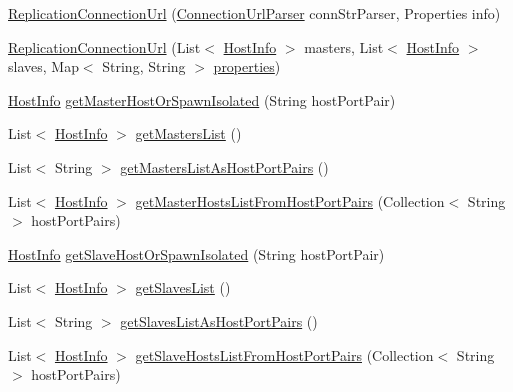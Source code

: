 \begin{DoxyCompactItemize}
\item 
\mbox{\hyperlink{classcom_1_1mysql_1_1cj_1_1conf_1_1url_1_1_replication_connection_url_a47f9dd61da2b65fffb464040033f39d1}{Replication\+Connection\+Url}} (\mbox{\hyperlink{classcom_1_1mysql_1_1cj_1_1conf_1_1_connection_url_parser}{Connection\+Url\+Parser}} conn\+Str\+Parser, Properties info)
\item 
\mbox{\hyperlink{classcom_1_1mysql_1_1cj_1_1conf_1_1url_1_1_replication_connection_url_a5f5fa218d72c2bdba66c694143ad568d}{Replication\+Connection\+Url}} (List$<$ \mbox{\hyperlink{classcom_1_1mysql_1_1cj_1_1conf_1_1_host_info}{Host\+Info}} $>$ masters, List$<$ \mbox{\hyperlink{classcom_1_1mysql_1_1cj_1_1conf_1_1_host_info}{Host\+Info}} $>$ slaves, Map$<$ String, String $>$ \mbox{\hyperlink{classcom_1_1mysql_1_1cj_1_1conf_1_1_connection_url_afc53ba40da35bf161d2df6fbd785b09b}{properties}})
\item 
\mbox{\hyperlink{classcom_1_1mysql_1_1cj_1_1conf_1_1_host_info}{Host\+Info}} \mbox{\hyperlink{classcom_1_1mysql_1_1cj_1_1conf_1_1url_1_1_replication_connection_url_ab075191dbdcebb32ccbbe1eeb9896c1c}{get\+Master\+Host\+Or\+Spawn\+Isolated}} (String host\+Port\+Pair)
\item 
List$<$ \mbox{\hyperlink{classcom_1_1mysql_1_1cj_1_1conf_1_1_host_info}{Host\+Info}} $>$ \mbox{\hyperlink{classcom_1_1mysql_1_1cj_1_1conf_1_1url_1_1_replication_connection_url_aea588a641fe3e6352f0ca5c9940fc80a}{get\+Masters\+List}} ()
\item 
List$<$ String $>$ \mbox{\hyperlink{classcom_1_1mysql_1_1cj_1_1conf_1_1url_1_1_replication_connection_url_a23e035f89d2356bf7939b354266efc3d}{get\+Masters\+List\+As\+Host\+Port\+Pairs}} ()
\item 
List$<$ \mbox{\hyperlink{classcom_1_1mysql_1_1cj_1_1conf_1_1_host_info}{Host\+Info}} $>$ \mbox{\hyperlink{classcom_1_1mysql_1_1cj_1_1conf_1_1url_1_1_replication_connection_url_a210692bdc210c25db156b88f7024e8bb}{get\+Master\+Hosts\+List\+From\+Host\+Port\+Pairs}} (Collection$<$ String $>$ host\+Port\+Pairs)
\item 
\mbox{\hyperlink{classcom_1_1mysql_1_1cj_1_1conf_1_1_host_info}{Host\+Info}} \mbox{\hyperlink{classcom_1_1mysql_1_1cj_1_1conf_1_1url_1_1_replication_connection_url_a7f3ecb4637ad23b6731d2fc9f70c55dd}{get\+Slave\+Host\+Or\+Spawn\+Isolated}} (String host\+Port\+Pair)
\item 
List$<$ \mbox{\hyperlink{classcom_1_1mysql_1_1cj_1_1conf_1_1_host_info}{Host\+Info}} $>$ \mbox{\hyperlink{classcom_1_1mysql_1_1cj_1_1conf_1_1url_1_1_replication_connection_url_ad187e71f456d74a6e9d5533944a10489}{get\+Slaves\+List}} ()
\item 
List$<$ String $>$ \mbox{\hyperlink{classcom_1_1mysql_1_1cj_1_1conf_1_1url_1_1_replication_connection_url_aaf09eba8b7c2e3d417b6a9d4df7264a4}{get\+Slaves\+List\+As\+Host\+Port\+Pairs}} ()
\item 
List$<$ \mbox{\hyperlink{classcom_1_1mysql_1_1cj_1_1conf_1_1_host_info}{Host\+Info}} $>$ \mbox{\hyperlink{classcom_1_1mysql_1_1cj_1_1conf_1_1url_1_1_replication_connection_url_a8298b0962db02256dc6f0e6cbf475d8c}{get\+Slave\+Hosts\+List\+From\+Host\+Port\+Pairs}} (Collection$<$ String $>$ host\+Port\+Pairs)
\end{DoxyCompactItemize}
